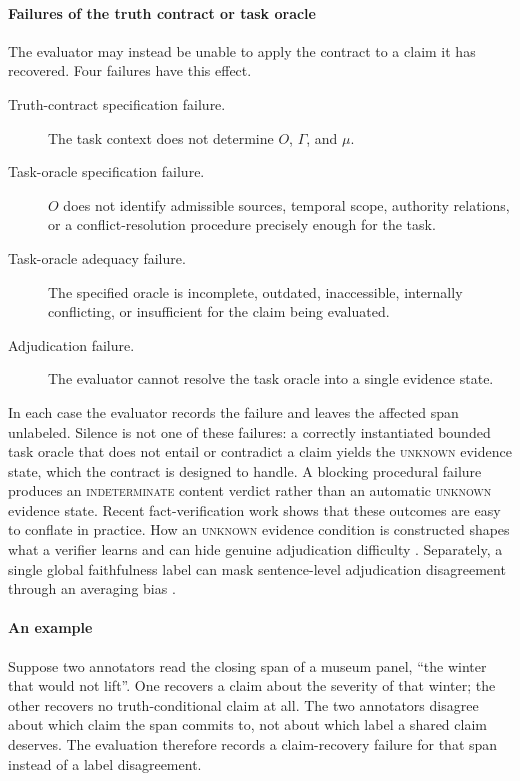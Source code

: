\documentclass{clv2025}
\begin{document}
\paragraph{Failures of the truth contract or task oracle}
The evaluator may instead be unable to apply the contract to a claim it has
recovered. Four failures have this effect.
\begin{description}
  \item[Truth-contract specification failure.] The task context does not
        determine $O$, $\Gamma$, and $\mu$.
  \item[Task-oracle specification failure.] $O$ does not identify admissible
        sources, temporal scope, authority relations, or a conflict-resolution
        procedure precisely enough for the task.
  \item[Task-oracle adequacy failure.] The specified oracle is incomplete,
        outdated, inaccessible, internally conflicting, or insufficient for the
        claim being evaluated.
  \item[Adjudication failure.] The evaluator cannot resolve the task oracle
        into a single evidence state.
\end{description}
In each case the evaluator records the failure and leaves the affected span
unlabeled.
Silence is not one of these failures: a correctly instantiated bounded task
oracle that does not entail or contradict a claim yields the
\textsc{unknown} evidence state, which the contract is designed to handle.
A blocking procedural failure produces an \textsc{indeterminate} content
verdict rather than an automatic \textsc{unknown} evidence state.
Recent fact-verification work shows that these outcomes are easy to conflate in
practice. How an \textsc{unknown} evidence condition is constructed shapes what
a verifier learns and can hide genuine adjudication difficulty
\citep{qiu_evidence_2026}. Separately, a single global faithfulness label can
mask sentence-level adjudication disagreement through an averaging bias
\citep{zhang_averaging_2026}.

\paragraph{An example}
Suppose two annotators read the closing span of a museum panel, ``the winter
that would not lift''.
One recovers a claim about the severity of that winter; the other recovers no
truth-conditional claim at all.
The two annotators disagree about which claim the span commits to, not about
which label a shared claim deserves.
The evaluation therefore records a claim-recovery failure for that span instead
of a label disagreement.
\end{document}
